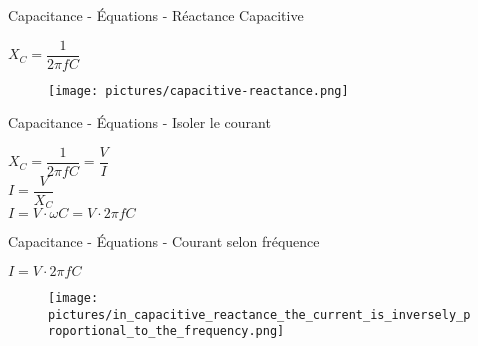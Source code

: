 \begin{frame}{Capacitance - Équations - Réactance Capacitive}
    \begin{center}
        \Large{
            $X_C = \dfrac{1}{2 \pi f C}$
        }
        \vspace{15pt}
        \begin{figure}
            \centering
            \texttt{[image: pictures/capacitive-reactance.png]}
        \end{figure}
    \end{center}
\end{frame}

\begin{frame}{Capacitance - Équations - Isoler le courant}
    \begin{center}
        \Large{
            $X_C = \dfrac{1}{2 \pi f C} = \dfrac{V}{I}$\\
            \vspace{15pt}
            $I = \dfrac{V}{X_C}$\\
            \vspace{5pt}
            $I = V \cdot \omega C = V \cdot 2 \pi f C$\\
        }
    \end{center}
\end{frame}

\begin{frame}{Capacitance - Équations - Courant selon fréquence}
    \begin{center}
        \Large{
            $I = V \cdot 2 \pi f C$
        }
        \vspace{15pt}
        \begin{figure}
            \centering
            \texttt{[image: pictures/in\_capacitive\_reactance\_the\_current\_is\_inversely\_proportional\_to\_the\_frequency.png]}
        \end{figure}
    \end{center}
\end{frame}






